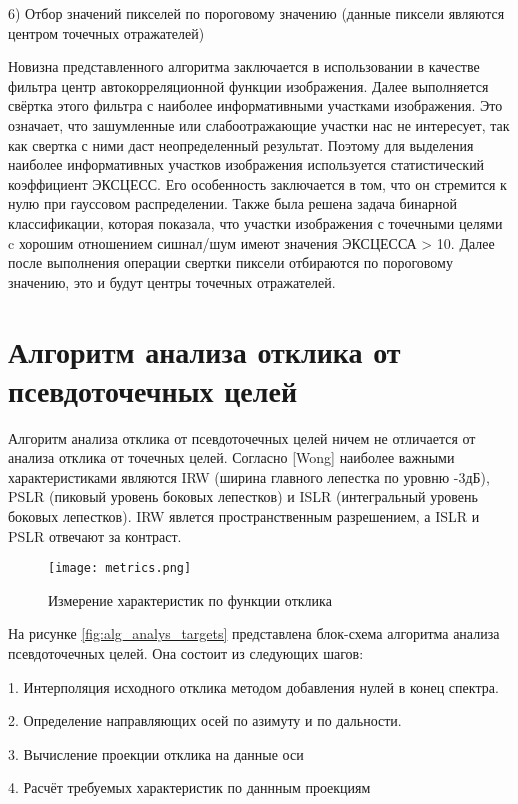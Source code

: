 	6) Отбор значений пикселей по пороговому значению (данные пиксели являются центром точечных отражателей)

	Новизна представленного алгоритма заключается в использовании в качестве фильтра центр автокорреляционной функции изображения. Далее выполняется свёртка этого фильтра с наиболее информативными участками изображения. Это означает, что зашумленные или слабоотражающие участки нас не интересует, так как свертка с ними даст неопределенный результат. Поэтому для выделения наиболее информативных участков изображения используется статистический коэффициент ЭКСЦЕСС. Его особенность заключается в том, что он стремится к нулю при гауссовом распределении. Также была решена задача бинарной классификации, которая показала, что участки изображения с точечными целями c хорошим отношением сишнал/шум имеют значения ЭКСЦЕССА > 10. Далее после выполнения операции свертки пиксели отбираются по пороговому значению, это и будут центры точечных отражателей.		

\section{Алгоритм анализа отклика от псевдоточечных целей}

	Алгоритм анализа отклика от псевдоточечных целей ничем не отличается от анализа отклика от точечных целей. Согласно [Wong] наиболее важными характеристиками являются IRW (ширина главного лепестка по уровню -3дБ), PSLR (пиковый уровень боковых лепестков) и ISLR (интегральный уровень боковых лепестков). IRW явлется пространственным разрешением, а ISLR и PSLR отвечают за контраст.  
	

\begin{figure}[ht]
    \centering
    \texttt{[image: metrics.png]}
    \caption{Измерение характеристик по функции отклика}
    \label{fig:metrics}
\end{figure}
	
	На рисунке \ref{fig:alg_analys_targets} представлена блок-схема алгоритма анализа псевдоточечных целей. Она состоит из следующих шагов:
	
	1. Интерполяция исходного отклика методом добавления нулей в конец спектра.
	
	2. Определение направляющих осей по азимуту и по дальности.
	
	3. Вычисление проекции отклика на данные оси
	
	4. Расчёт требуемых характеристик по даннным проекциям
	
